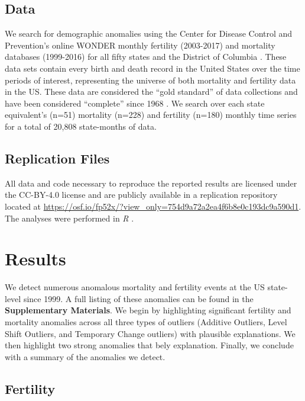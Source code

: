 \documentclass[12pt]{article}
\begin{document}
\hypertarget{data}{%
\subsection{Data}\label{data}}

We search for demographic anomalies using the Center for Disease Control
and Prevention's online WONDER monthly fertility (2003-2017) and
mortality databases (1999-2016) for all fifty states and the District of
Columbia \citep{CDC_fert07, CDC_mort}. These data sets contain every
birth and death record in the United States over the time periods of
interest, representing the universe of both mortality and fertility data
in the US. These data are considered the ``gold standard'' of data
collections \citep{mahapatra2007civil} and have been considered
``complete'' since 1968 \citep{hetzel2016us}. We search over each state
equivalent's (n=51) mortality (n=228) and fertility (n=180) monthly time
series for a total of 20,808 state-months of data.

\hypertarget{replication-files}{%
\subsection{Replication Files}\label{replication-files}}

All data and code necessary to reproduce the reported results are
licensed under the CC-BY-4.0 license and are publicly available in a
replication repository located at
\url{https://osf.io/fp52x/?view_only=754d9a72a2ea4f6b8e0c193dc9a590d1}.
The analyses were performed in \emph{R} \citep{rcite}.

\hypertarget{results}{%
\section{Results}\label{results}}

We detect numerous anomalous mortality and fertility events at the US
state-level since 1999. A full listing of these anomalies can be found
in the \textbf{Supplementary Materials}. We begin by highlighting
significant fertility and mortality anomalies across all three types of
outliers (Additive Outliers, Level Shift Outliers, and Temporary Change
outliers) with plausible explanations. We then highlight two strong
anomalies that bely explanation. Finally, we conclude with a summary of
the anomalies we detect.

\hypertarget{fertility}{%
\subsection{Fertility}\label{fertility}}
\end{document}
